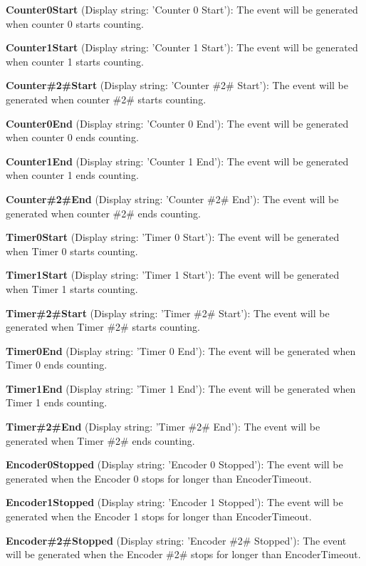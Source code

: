\begin{DoxyItemize}
\item {\bfseries Counter0\+Start} (Display string\+: 'Counter 0 Start')\+: The event will be generated when counter 0 starts counting.
\item {\bfseries Counter1\+Start} (Display string\+: 'Counter 1 Start')\+: The event will be generated when counter 1 starts counting.
\item {\bfseries Counter\#2\#Start} (Display string\+: 'Counter \#2\# Start')\+: The event will be generated when counter \#2\# starts counting.
\item {\bfseries Counter0\+End} (Display string\+: 'Counter 0 End')\+: The event will be generated when counter 0 ends counting.
\item {\bfseries Counter1\+End} (Display string\+: 'Counter 1 End')\+: The event will be generated when counter 1 ends counting.
\item {\bfseries Counter\#2\#End} (Display string\+: 'Counter \#2\# End')\+: The event will be generated when counter \#2\# ends counting.
\item {\bfseries Timer0\+Start} (Display string\+: 'Timer 0 Start')\+: The event will be generated when Timer 0 starts counting.
\item {\bfseries Timer1\+Start} (Display string\+: 'Timer 1 Start')\+: The event will be generated when Timer 1 starts counting.
\item {\bfseries Timer\#2\#Start} (Display string\+: 'Timer \#2\# Start')\+: The event will be generated when Timer \#2\# starts counting.
\item {\bfseries Timer0\+End} (Display string\+: 'Timer 0 End')\+: The event will be generated when Timer 0 ends counting.
\item {\bfseries Timer1\+End} (Display string\+: 'Timer 1 End')\+: The event will be generated when Timer 1 ends counting.
\item {\bfseries Timer\#2\#End} (Display string\+: 'Timer \#2\# End')\+: The event will be generated when Timer \#2\# ends counting.
\item {\bfseries Encoder0\+Stopped} (Display string\+: 'Encoder 0 Stopped')\+: The event will be generated when the Encoder 0 stops for longer than Encoder\+Timeout.
\item {\bfseries Encoder1\+Stopped} (Display string\+: 'Encoder 1 Stopped')\+: The event will be generated when the Encoder 1 stops for longer than Encoder\+Timeout.
\item {\bfseries Encoder\#2\#Stopped} (Display string\+: 'Encoder \#2\# Stopped')\+: The event will be generated when the Encoder \#2\# stops for longer than Encoder\+Timeout.

\end{DoxyItemize}
